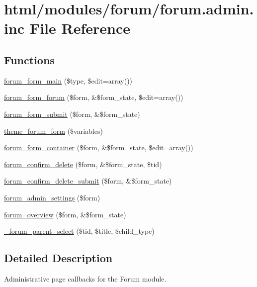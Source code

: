 \hypertarget{forum_8admin_8inc}{
\section{html/modules/forum/forum.admin.inc File Reference}
\label{forum_8admin_8inc}
}
\subsection*{Functions}
\begin{DoxyCompactItemize}
\item 
\hyperlink{forum_8admin_8inc_aac7be1aa9e7ee3f1ff6a495c0c68b5de}{forum\_\-form\_\-main} (\$type, \$edit=array())
\item 
\hyperlink{group__forms_ga74d0d5997a52e44a382cd6792b8718dc}{forum\_\-form\_\-forum} (\$form, \&\$form\_\-state, \$edit=array())
\item 
\hyperlink{forum_8admin_8inc_a517cd1e23374b0242a197a3c5250a0c9}{forum\_\-form\_\-submit} (\$form, \&\$form\_\-state)
\item 
\hyperlink{group__themeable_ga32e5ebb6f4e42f0e96175e6c11fb66d1}{theme\_\-forum\_\-form} (\$variables)
\item 
\hyperlink{group__forms_gaaf28a1fc0cf33c8cc9f8ffd08fad202c}{forum\_\-form\_\-container} (\$form, \&\$form\_\-state, \$edit=array())
\item 
\hyperlink{group__forms_ga2e160e8a91338ff16883e27d806eb63e}{forum\_\-confirm\_\-delete} (\$form, \&\$form\_\-state, \$tid)
\item 
\hyperlink{forum_8admin_8inc_aef93d685b6f28845e233fc1f697c05ab}{forum\_\-confirm\_\-delete\_\-submit} (\$form, \&\$form\_\-state)
\item 
\hyperlink{group__forms_ga1e08f493fe043879a93e783b05cfb870}{forum\_\-admin\_\-settings} (\$form)
\item 
\hyperlink{group__forms_ga889bd81421fcd1aa02d5fc45c5ff8256}{forum\_\-overview} (\$form, \&\$form\_\-state)
\item 
\hyperlink{forum_8admin_8inc_ab33107c6a704c306d24ed1ea5dd8dc35}{\_\-forum\_\-parent\_\-select} (\$tid, \$title, \$child\_\-type)
\end{DoxyCompactItemize}


\subsection{Detailed Description}
Administrative page callbacks for the Forum module. 

